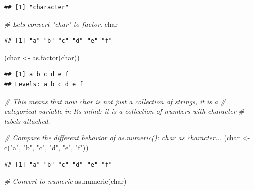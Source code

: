 \documentclass[
]{book}
\newenvironment{Shaded}{\begin{snugshade}}{\end{snugshade}}
\newcommand{\CommentTok}[1]{\textcolor[rgb]{0.56,0.35,0.01}{\textit{#1}}}
\newcommand{\FunctionTok}[1]{\textcolor[rgb]{0.00,0.00,0.00}{#1}}
\newcommand{\NormalTok}[1]{#1}
\newcommand{\OtherTok}[1]{\textcolor[rgb]{0.56,0.35,0.01}{#1}}
\newcommand{\StringTok}[1]{\textcolor[rgb]{0.31,0.60,0.02}{#1}}
\begin{document}
\begin{verbatim}
## [1] "character"
\end{verbatim}

\begin{Shaded}
\begin{Highlighting}[]
\CommentTok{\# Let\textquotesingle{}s convert "char" to factor.}
\NormalTok{char}
\end{Highlighting}
\end{Shaded}

\begin{verbatim}
## [1] "a" "b" "c" "d" "e" "f"
\end{verbatim}

\begin{Shaded}
\begin{Highlighting}[]
\NormalTok{(char }\OtherTok{\textless{}{-}} \FunctionTok{as.factor}\NormalTok{(char))}
\end{Highlighting}
\end{Shaded}

\begin{verbatim}
## [1] a b c d e f
## Levels: a b c d e f
\end{verbatim}

\begin{Shaded}
\begin{Highlighting}[]
\CommentTok{\# This means that now char is not just a collection of strings, it is a}
\CommentTok{\# categorical variable in R\textquotesingle{}s mind: it is a collection of numbers with character}
\CommentTok{\# labels attached.}

\CommentTok{\# Compare the different behavior of as.numeric(): char as character...}
\NormalTok{(char }\OtherTok{\textless{}{-}} \FunctionTok{c}\NormalTok{(}\StringTok{"a"}\NormalTok{, }\StringTok{"b"}\NormalTok{, }\StringTok{"c"}\NormalTok{, }\StringTok{"d"}\NormalTok{, }\StringTok{"e"}\NormalTok{, }\StringTok{"f"}\NormalTok{))}
\end{Highlighting}
\end{Shaded}

\begin{verbatim}
## [1] "a" "b" "c" "d" "e" "f"
\end{verbatim}

\begin{Shaded}
\begin{Highlighting}[]
\CommentTok{\# Convert to numeric}
\FunctionTok{as.numeric}\NormalTok{(char)}
\end{Highlighting}
\end{Shaded}
\end{document}

